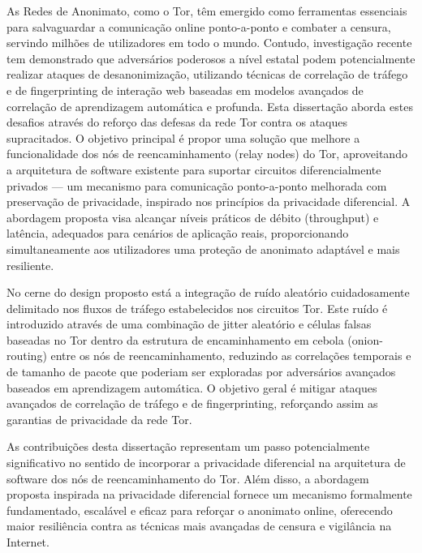 
%

As Redes de Anonimato, como o Tor, têm emergido como ferramentas essenciais para salvaguardar a comunicação online ponto-a-ponto e combater a censura, servindo milhões de utilizadores em todo o mundo. Contudo, investigação recente tem demonstrado que adversários poderosos a nível estatal podem potencialmente realizar ataques de desanonimização, utilizando técnicas de correlação de tráfego e de fingerprinting de interação web baseadas em modelos avançados de correlação de aprendizagem automática e profunda. Esta dissertação aborda estes desafios através do reforço das defesas da rede Tor contra os ataques supracitados. O objetivo principal é propor uma solução que melhore a funcionalidade dos nós de reencaminhamento (relay nodes) do Tor, aproveitando a arquitetura de software existente para suportar circuitos diferencialmente privados — um mecanismo para comunicação ponto-a-ponto melhorada com preservação de privacidade, inspirado nos princípios da privacidade diferencial. A abordagem proposta visa alcançar níveis práticos de débito (throughput) e latência, adequados para cenários de aplicação reais, proporcionando simultaneamente aos utilizadores uma proteção de anonimato adaptável e mais resiliente.

No cerne do design proposto está a integração de ruído aleatório cuidadosamente delimitado nos fluxos de tráfego estabelecidos nos circuitos Tor. Este ruído é introduzido através de uma combinação de jitter aleatório e células falsas baseadas no Tor dentro da estrutura de encaminhamento em cebola (onion-routing) entre os nós de reencaminhamento, reduzindo as correlações temporais e de tamanho de pacote que poderiam ser exploradas por adversários avançados baseados em aprendizagem automática. O objetivo geral é mitigar ataques avançados de correlação de tráfego e de fingerprinting, reforçando assim as garantias de privacidade da rede Tor.

As contribuições desta dissertação representam um passo potencialmente significativo no sentido de incorporar a privacidade diferencial na arquitetura de software dos nós de reencaminhamento do Tor. Além disso, a abordagem proposta inspirada na privacidade diferencial fornece um mecanismo formalmente fundamentado, escalável e eficaz para reforçar o anonimato online, oferecendo maior resiliência contra as técnicas mais avançadas de censura e vigilância na Internet.


